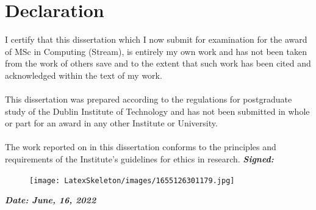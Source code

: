 \documentclass[oneside,12pt]{book}
\begin{document}
\chapter*{Declaration}
I certify that this dissertation which I now submit for examination for the award of
MSc in Computing (Stream), is entirely my own work and has not been taken
from the work of others save and to the extent that such work has been cited and
acknowledged within the text of my work.
\\
\\
This dissertation was prepared according to the regulations for postgraduate study of
the Dublin Institute of Technology and has not been submitted in whole or part for an
award in any other Institute or University.
\\
\\
The work reported on in this dissertation conforms to the principles and requirements
of the Institute’s guidelines for ethics in research.
\vfill
\noindent
\textit{\textbf{Signed:}}  \\
\begin{figure}[H]
    \raggedright
    \texttt{[image: LatexSkeleton/images/1655126301179.jpg]}
\end{figure}
\noindent
\textit{\textbf{Date: June, 16, 2022}}
\vspace{0.8cm}

\end{document}
